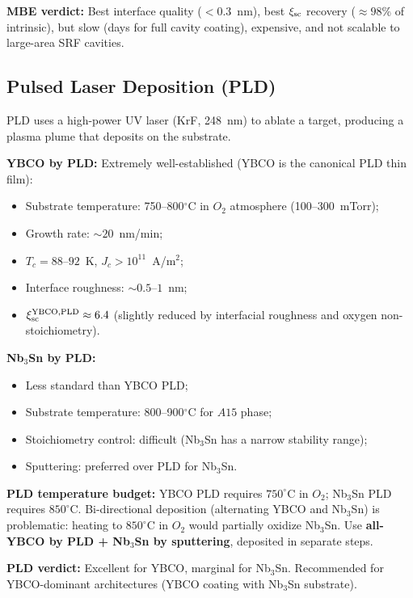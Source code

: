 \documentclass[11pt]{article}
\begin{document}
\textbf{MBE verdict:} Best interface quality ($< 0.3$~nm), best $\xi_{\rm sc}$
recovery ($\approx 98\%$ of intrinsic), but slow (days for full cavity
coating), expensive, and not scalable to large-area SRF cavities.

\subsection{Pulsed Laser Deposition (PLD)}

PLD uses a high-power UV laser (KrF, 248~nm) to ablate a target, producing
a plasma plume that deposits on the substrate.

\textbf{YBCO by PLD:} Extremely well-established (YBCO is the canonical
PLD thin film):
\begin{itemize}
  \item Substrate temperature: 750--800$^\circ$C in $O_2$ atmosphere
        (100--300~mTorr);
  \item Growth rate: $\sim 20$~nm/min;
  \item $T_c = 88$--$92$~K, $J_c > 10^{11}$~A/m$^2$;
  \item Interface roughness: $\sim 0.5$--$1$~nm;
  \item $\xi_{\rm sc}^{\rm YBCO,PLD} \approx 6.4$ (slightly reduced by
        interfacial roughness and oxygen non-stoichiometry).
\end{itemize}

\textbf{Nb$_3$Sn by PLD:}
\begin{itemize}
  \item Less standard than YBCO PLD;
  \item Substrate temperature: 800--900$^\circ$C for $A15$ phase;
  \item Stoichiometry control: difficult (Nb$_3$Sn has a narrow stability range);
  \item Sputtering: preferred over PLD for Nb$_3$Sn.
\end{itemize}

\textbf{PLD temperature budget:}
YBCO PLD requires $750^\circ$C in $O_2$; Nb$_3$Sn PLD requires $850^\circ$C.
Bi-directional deposition (alternating YBCO and Nb$_3$Sn) is problematic:
heating to $850^\circ$C in $O_2$ would partially oxidize Nb$_3$Sn. Use
\textbf{all-YBCO by PLD + Nb$_3$Sn by sputtering}, deposited in separate
steps.

\textbf{PLD verdict:} Excellent for YBCO, marginal for Nb$_3$Sn.
Recommended for YBCO-dominant architectures (YBCO coating with Nb$_3$Sn
substrate).
\end{document}
